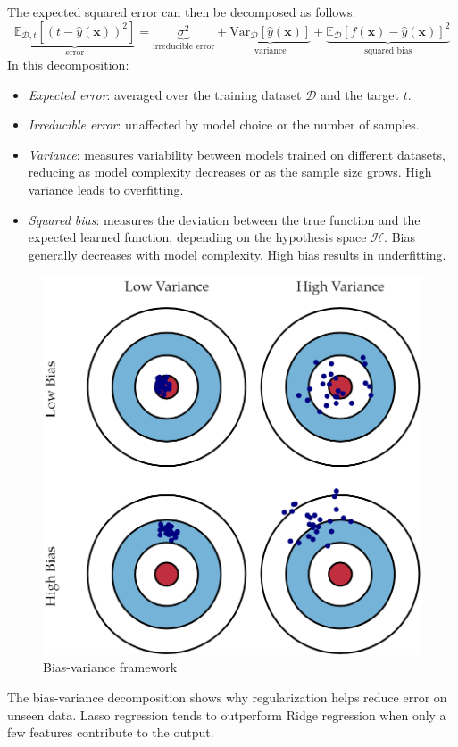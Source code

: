 The expected squared error can then be decomposed as follows:
\[\underbrace{\mathbb{E}_{\mathcal{D},t}\left[ {\left( t-\hat{y}(\mathbf{x}) \right)}^2 \right]}_{\text{error}} = \underbrace{\sigma^2}_{\text{irreducible error}}  +  \underbrace{\text{Var}_{\mathcal{D}}\left[\hat{y}(\mathbf{x}) \right]}_{\text{variance}}  +  \underbrace{\mathbb{E}_{\mathcal{D}}{\left[f(\mathbf{x}) -\hat{y}(\mathbf{x}) \right]}^2}_{\text{squared bias}}\]
In this decomposition:
\begin{itemize}
    \item \textit{Expected error}: averaged over the training dataset $\mathcal{D}$ and the target $t$.
    \item \textit{Irreducible error}: unaffected by model choice or the number of samples.
    \item \textit{Variance}: measures variability between models trained on different datasets, reducing as model complexity decreases or as the sample size grows. 
        High variance leads to overfitting.
    \item \textit{Squared bias}: measures the deviation between the true function and the expected learned function, depending on the hypothesis space $\mathcal{H}$. 
        Bias generally decreases with model complexity. 
        High bias results in underfitting.
\end{itemize}
\begin{figure}[H]
    \centering
    \includegraphics[width=0.5\linewidth]{images/bvf.png}
    \caption{Bias-variance framework}
\end{figure}
The bias-variance decomposition shows why regularization helps reduce error on unseen data. 
Lasso regression tends to outperform Ridge regression when only a few features contribute to the output.

